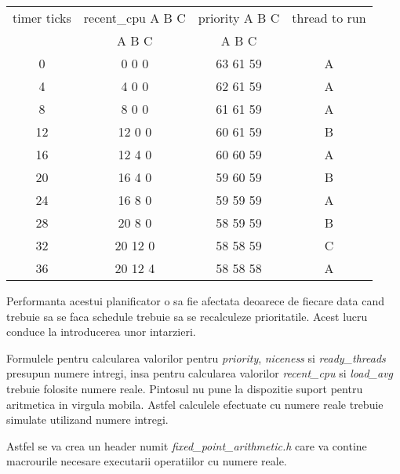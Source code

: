 \documentclass[a4paper,12pt]{report}
\begin{document}
\begin{center}
 \begin{tabular}{||c c c c||} 
 \hline
 timer ticks & recent\_cpu  A B C & priority  A B C & thread to run \\ [0.5ex]
  & A B C & A B C & \\
 \hline\hline
 0 & 0 0 0& 63 61 59 & A \\ 
 \hline
 4 & 4 0 0& 62 61 59 & A \\
 \hline
 8 & 8 0 0& 61 61 59 & A \\
 \hline
 12 & 12 0 0& 60 61 59 & B \\
 \hline
 16 & 12 4 0& 60 60 59 & A \\
 \hline
 20 & 16 4 0& 59 60 59 & B \\
 \hline
 24 & 16 8 0& 59 59 59 & A \\
 \hline
 28 & 20 8 0& 58 59 59 & B \\
 \hline
 32 & 20 12 0& 58 58 59 & C \\
 \hline
 36 & 20 12 4& 58 58 58 & A \\
 \hline
\end{tabular}
\end{center}

Performanta acestui planificator o sa fie afectata deoarece de fiecare data cand trebuie sa se faca
schedule trebuie sa se recalculeze prioritatile. Acest lucru conduce la introducerea unor intarzieri.

Formulele pentru calcularea valorilor pentru \textit{priority}, \textit{niceness} si \textit{ready\_threads} presupun numere 
intregi, insa pentru calcularea valorilor \textit{recent\_cpu} si \textit{load\_avg} trebuie folosite numere reale. Pintosul 
nu pune la dispozitie suport pentru aritmetica in virgula mobila. Astfel calculele efectuate cu numere
reale trebuie simulate utilizand numere intregi. 

Astfel se va crea un header numit \textit{fixed\_point\_arithmetic.h} care va contine macrourile necesare
executarii operatiilor cu numere reale.
\end{document}
